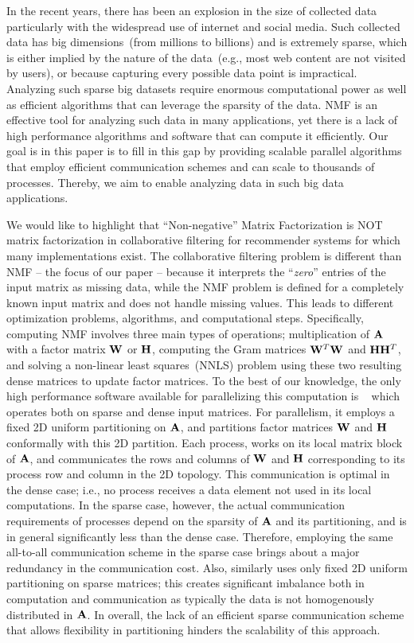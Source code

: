 In the recent years, there has been an explosion in the size of collected data particularly with the widespread use of internet and social media.
Such collected data has big dimensions~(from millions to billions) and is extremely sparse, which is either implied by the nature of the data~(e.g., most web content are not visited by users), or because capturing every possible data point is impractical.
Analyzing such sparse big datasets require enormous computational power as well as efficient algorithms that can leverage the sparsity of the data.
NMF is an effective tool for analyzing such data in many applications, yet there is a lack of high performance algorithms and software that can compute it efficiently.
Our goal is in this paper is to fill in this gap by providing scalable parallel algorithms that employ efficient communication schemes and can scale to thousands of processes.
Thereby, we aim to enable analyzing data in such big data applications.

We would like to highlight that ``Non-negative'' Matrix Factorization is NOT matrix factorization in collaborative filtering for recommender systems for which many implementations exist.
The collaborative filtering problem is different than NMF -- the focus of our paper -- because it interprets the ``{\em zero}'' entries of the input matrix as missing data, while the NMF problem is defined for a completely known input matrix and does not handle missing values.
This leads to different optimization problems, algorithms, and computational steps.
Specifically, computing NMF involves three main types of operations; multiplication of $\mathbf{A}$ with a factor matrix $\mathbf{W}$ or $\mathbf{H}$, computing the Gram matrices $\mathbf{W}^T \mathbf{W}$ and $\mathbf{H} \mathbf{H}^T$, and solving a non-linear least squares~(NNLS) problem using these two resulting dense matrices to update factor matrices.
To the best of our knowledge, the only high performance software available for parallelizing this computation is \mpifaun~\cite{KBP16MPIFAUN} which operates both on sparse and dense input matrices.
For parallelism, it employs a fixed 2D uniform partitioning on $\mathbf{A}$, and partitions factor matrices $\mathbf{W}$ and $\mathbf{H}$ conformally with this 2D partition.
Each process, works on its local matrix block of $\mathbf{A}$, and communicates the rows and columns of $\mathbf{W}$ and $\mathbf{H}$ corresponding to its process row and column in the 2D topology.
This communication is optimal in the dense case; i.e., no process receives a data element not used in its local computations.
In the sparse case, however, the actual communication requirements of processes depend on the sparsity of $\mathbf{A}$ and its partitioning, and is in general significantly less than the dense case.
Therefore, employing the same all-to-all communication scheme in the sparse case brings about a major redundancy in the communication cost.
Also, \mpifaun similarly uses only fixed 2D uniform partitioning on sparse matrices; this creates significant imbalance both in computation and communication as typically the data is not homogenously distributed in $\mathbf{A}$.
In overall, the lack of an efficient sparse communication scheme that allows flexibility in partitioning hinders the scalability of this approach.

